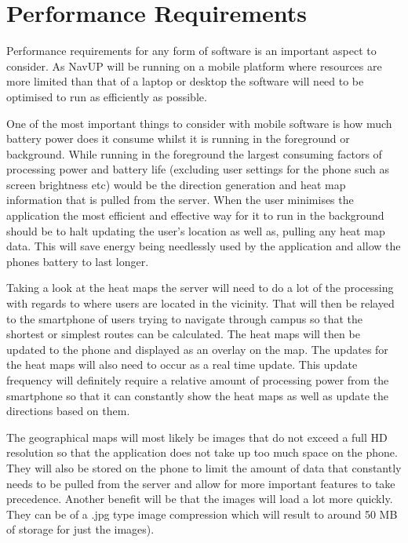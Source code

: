 \documentclass[11pt]{article}
\begin{document}
\newpage

\section{Performance Requirements}

Performance requirements for any form of software is an important aspect to consider. As NavUP will be running on a mobile platform where resources are more limited than that of a laptop or desktop the software will need to be optimised to run as efficiently as possible.

One of the most important things to consider with mobile software is how much battery power does it consume whilst it is running in the foreground or background. While running in the foreground the largest consuming factors of processing power and battery life (excluding user settings for the phone such as screen brightness etc) would be the direction generation and heat map information that is pulled from the server. When the user minimises the application the most efficient and effective way for it to run in the background should be to halt updating the user’s location as well as, pulling any heat map data. This will save energy being needlessly used by the application and allow the phones battery to last longer. 

Taking a look at the heat maps the server will need to do a lot of the processing with regards to where users are located in the vicinity. That will then be relayed to the smartphone of users trying to navigate through campus so that the shortest or simplest routes can be calculated. The heat maps will then be updated to the phone and displayed as an overlay on the map. The updates for the heat maps will also need to occur as a real time update. This update frequency will definitely require a relative amount of processing power from the smartphone so that it can constantly show the heat maps as well as update the directions based on them.

The geographical maps will most likely be images that do not exceed a full HD resolution so that the application does not take up too much space on the phone. They will also be stored on the phone to limit the amount of data that constantly needs to be pulled from the server and allow for more important features to take precedence. Another benefit will be that the images will load a lot more quickly. They can be of a .jpg type image compression which will result to around 50 MB of storage for just the images). 
\end{document}
